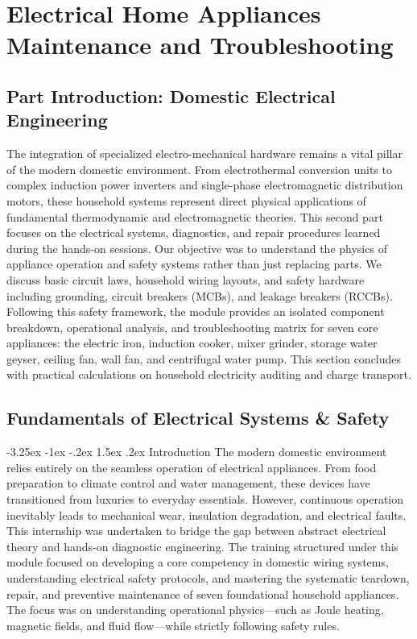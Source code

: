 \documentclass[11pt,a4paper]{report}
\makeatletter
\renewcommand{\section}{\@startsection{section}{1}{\z@}%
  {-3.25ex \@plus -1ex \@minus -.2ex}%
  {1.5ex \@plus.2ex}%
  {\normalfont\Large\bfseries\color{primaryColor}}}
\makeatother
\begin{document}
\part{Electrical Home Appliances Maintenance and Troubleshooting}
\chapter*{Part Introduction: Domestic Electrical Engineering}
The integration of specialized electro-mechanical hardware remains a vital pillar of the modern domestic environment. From electrothermal conversion units to complex induction power inverters and single-phase electromagnetic distribution motors, these household systems represent direct physical applications of fundamental thermodynamic and electromagnetic theories. This second part focuses on the electrical systems, diagnostics, and repair procedures learned during the hands-on sessions. Our objective was to understand the physics of appliance operation and safety systems rather than just replacing parts. We discuss basic circuit laws, household wiring layouts, and safety hardware including grounding, circuit breakers (MCBs), and leakage breakers (RCCBs). Following this safety framework, the module provides an isolated component breakdown, operational analysis, and troubleshooting matrix for seven core appliances: the electric iron, induction cooker, mixer grinder, storage water geyser, ceiling fan, wall fan, and centrifugal water pump. This section concludes with practical calculations on household electricity auditing and charge transport.
\chapter{Fundamentals of Electrical Systems \& Safety}
\section{Introduction}
The modern domestic environment relies entirely on the seamless operation of electrical appliances. From food preparation to climate control and water management, these devices have transitioned from luxuries to everyday essentials. However, continuous operation inevitably leads to mechanical wear, insulation degradation, and electrical faults. This internship was undertaken to bridge the gap between abstract electrical theory and hands-on diagnostic engineering. The training structured under this module focused on developing a core competency in domestic wiring systems, understanding electrical safety protocols, and mastering the systematic teardown, repair, and preventive maintenance of seven foundational household appliances. The focus was on understanding operational physics—such as Joule heating, magnetic fields, and fluid flow—while strictly following safety rules.
\end{document}
